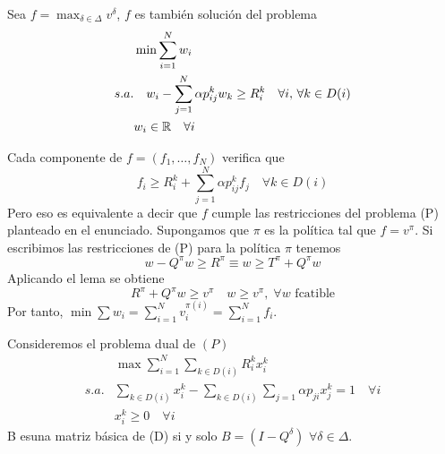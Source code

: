 \documentclass[MIOP.tex]{subfiles}
\begin{document}
\begin{teorema}
Sea $f=\max_{\delta \in \Delta}v^\delta$, $f$ es también solución del problema
\begin{align*}
&\min \sum_{i=1}^N w_i\\
s.a. &\quad w_i - \sum_{j=1}^N \alpha p_{ij}^k w_k \geq R^k_i\quad \forall i,\, \forall k\in D(i)\\
&w_i \in \mathbb{R} \quad \forall i
\end{align*}
\end{teorema}
\begin{dem}
Cada componente de $f=(f_1,\dotsc,f_N)$ verifica que 
$$
f_i \geq R_i^k + \sum_{j=1}^N \alpha p_{ij}^k f_j \quad \forall k\in D(i)$$
Pero eso es equivalente a decir que $f$ cumple las restricciones del problema (P) planteado en el enunciado. Supongamos que $\pi$ es la política tal que $f=v^\pi$. Si escribimos las restricciones de (P) para la política $\pi$ tenemos
$$
w-Q^\pi w \geq R^\pi \equiv w \geq T^\pi + Q^\pi w
$$
Aplicando el lema se obtiene
$$
R^\pi + Q^\pi w \geq v^\pi \quad w\geq v^\pi, \; \forall w \text{ fcatible}
$$
Por tanto, $\min \sum w_i = \sum_{i=1}^N v_i^{\pi(i)} = \sum_{i=1}^N f_i$.
\end{dem}
\begin{teorema}
Consideremos el problema dual de $(P)$
\begin{align*}
&\max \sum_{i=1}^N\sum_{k\in D(i)}R^k_i x_i^k\\
s.a. & \sum_{k\in D(i)} x_i^k - \sum_{k\in D(i)}\sum_{j=1} \alpha p_{ji} x_j^k = 1 \quad \forall i\\
&x_i^k \geq 0 \quad \forall i
\end{align*}
B esuna matriz básica de (D) si y solo $B=(I-Q^\delta)$ $\forall \delta \in \Delta$.
\end{teorema}
\end{document}
